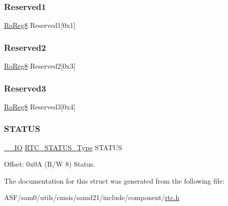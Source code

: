 \mbox{\label{struct_rtc_mode2_a092866123ac46d0985136e4dca2f36f4}} 
\subsubsection{\texorpdfstring{Reserved1}{Reserved1}}
{\footnotesize\ttfamily \mbox{\hyperlink{group___s_a_m_d21_e15_a__definitions_ga0d957f1433aaf5d70e4dc2b68288442d}{Ro\+Reg8}} Reserved1\mbox{[}0x1\mbox{]}}

\mbox{\label{struct_rtc_mode2_a3e3d4b7e35d84b272d434a1396e8b7be}} 
\subsubsection{\texorpdfstring{Reserved2}{Reserved2}}
{\footnotesize\ttfamily \mbox{\hyperlink{group___s_a_m_d21_e15_a__definitions_ga0d957f1433aaf5d70e4dc2b68288442d}{Ro\+Reg8}} Reserved2\mbox{[}0x3\mbox{]}}

\mbox{\label{struct_rtc_mode2_a85a9b205a274d973876024028f9ec39b}} 
\subsubsection{\texorpdfstring{Reserved3}{Reserved3}}
{\footnotesize\ttfamily \mbox{\hyperlink{group___s_a_m_d21_e15_a__definitions_ga0d957f1433aaf5d70e4dc2b68288442d}{Ro\+Reg8}} Reserved3\mbox{[}0x4\mbox{]}}

\mbox{\label{struct_rtc_mode2_a18fb82dd8352b8ac5b64e276ab0b5268}} 
\subsubsection{\texorpdfstring{STATUS}{STATUS}}
{\footnotesize\ttfamily \mbox{\hyperlink{core__cm0plus_8h_aec43007d9998a0a0e01faede4133d6be}{\+\_\+\+\_\+\+IO}} \mbox{\hyperlink{union_r_t_c___s_t_a_t_u_s___type}{R\+T\+C\+\_\+\+S\+T\+A\+T\+U\+S\+\_\+\+Type}} S\+T\+A\+T\+US}



Offset\+: 0x0A (R/W 8) Status. 



The documentation for this struct was generated from the following file\+:\begin{DoxyCompactItemize}
\item 
A\+S\+F/sam0/utils/cmsis/samd21/include/component/\mbox{\hyperlink{component_2rtc_8h}{rtc.\+h}}\end{DoxyCompactItemize}
